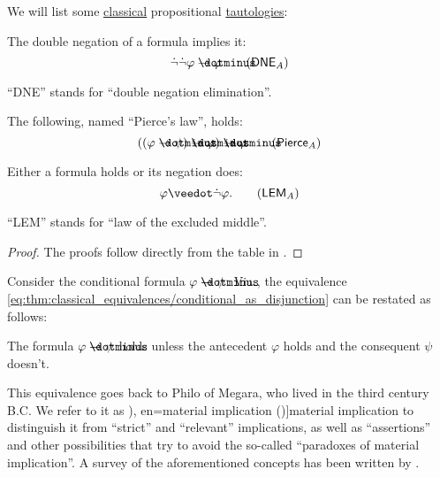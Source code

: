 \begin{proposition}\label{thm:classical_tautologies}
  We will list some \hyperref[def:propositional_semantics]{classical} propositional \hyperref[def:propositional_tautology]{tautologies}:
  \begin{thmenum}
     The double negation of a formula implies it:
    \begin{equation}\label{eq:thm:classical_tautologies/efq}
      \synneg \synneg \varphi \synimplies \varphi \tag{\( \logic{DNE}_A \)}
    \end{equation}

    \enquote{DNE} stands for \enquote{double negation elimination}.

     The following, named \enquote{Pierce's law}, holds:
    \begin{equation}\label{eq:thm:classical_tautologies/pierce}
      ((\varphi \synimplies \psi) \synimplies \varphi) \synimplies \varphi \tag{\( \logic{Pierce}_A \)}
    \end{equation}

     Either a formula holds or its negation does:
    \begin{equation}\label{eq:thm:classical_tautologies/lem}
      \varphi \synvee \synneg \varphi. \tag{\( \logic{LEM}_A \)}
    \end{equation}

    \enquote{LEM} stands for \enquote{law of the excluded middle}.
  \end{thmenum}
\end{proposition}
\begin{proof}
  The proofs follow directly from the table in .
\end{proof}

\begin{concept}\label{con:material_implication}
  Consider the conditional formula \( \varphi \synimplies \psi \). Via , the equivalence \eqref{eq:thm:classical_equivalences/conditional_as_disjunction} can be restated as follows:
  \begin{displayquote}
    The formula \( \varphi \synimplies \psi \) holds unless the antecedent \( \varphi \) holds and the consequent \( \psi \) doesn't.
  \end{displayquote}

  This equivalence goes back to Philo of Megara, who lived in the third century B.C. We refer to it as \term[ru=материальная импликация (\cite[74]{КолмогоровДрагалин2006}), en=material implication (\cite[9]{Kleene2002Logic})]{material implication} to distinguish it from \enquote{strict} and \enquote{relevant} implications, as well as \enquote{assertions} and other possibilities that try to avoid the so-called \enquote{paradoxes of material implication}. A survey of the aforementioned concepts has been written by .
\end{concept}
